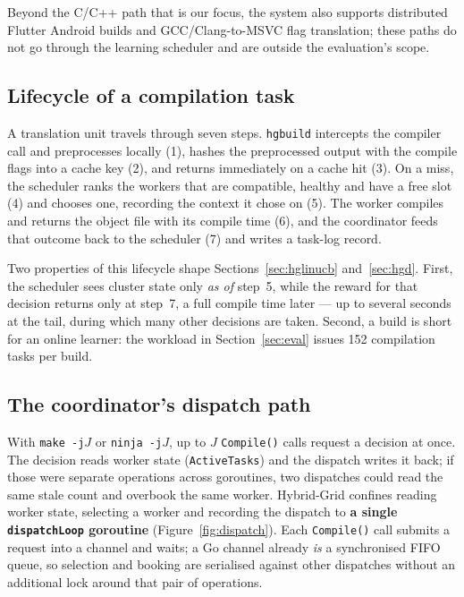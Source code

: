 \documentclass[final,5p,times,twocolumn]{elsarticle}
\begin{document}
Beyond the C/C++ path that is our focus, the system also supports distributed Flutter Android builds and GCC/Clang-to-MSVC flag translation; these paths do not go through the learning scheduler and are outside the evaluation's scope.

\subsection{Lifecycle of a compilation task}
\label{sec:lifecycle}

A translation unit travels through seven steps. \texttt{hgbuild} intercepts the compiler call and preprocesses locally (1), hashes the preprocessed output with the compile flags into a cache key (2), and returns immediately on a cache hit (3). On a miss, the scheduler ranks the workers that are compatible, healthy and have a free slot (4) and chooses one, recording the context it chose on (5). The worker compiles and returns the object file with its compile time (6), and the coordinator feeds that outcome back to the scheduler (7) and writes a task-log record.

Two properties of this lifecycle shape Sections~\ref{sec:hglinucb} and~\ref{sec:hgd}. First, the scheduler sees cluster state only \emph{as of} step~5, while the reward for that decision returns only at step~7, a full compile time later --- up to several seconds at the tail, during which many other decisions are taken. Second, a build is short for an online learner: the workload in Section~\ref{sec:eval} issues 152 compilation tasks per build.

\subsection{The coordinator's dispatch path}
\label{sec:dispatch}

With \texttt{make -j}$J$ or \texttt{ninja -j}$J$, up to $J$ \texttt{Compile()} calls request a decision at once. The decision reads worker state (\texttt{ActiveTasks}) and the dispatch writes it back; if those were separate operations across goroutines, two dispatches could read the same stale count and overbook the same worker. Hybrid-Grid confines reading worker state, selecting a worker and recording the dispatch to \textbf{a single \texttt{dispatchLoop} goroutine} (Figure~\ref{fig:dispatch}). Each \texttt{Compile()} call submits a request into a channel and waits; a Go channel already \emph{is} a synchronised FIFO queue, so selection and booking are serialised against other dispatches without an additional lock around that pair of operations.
\end{document}
